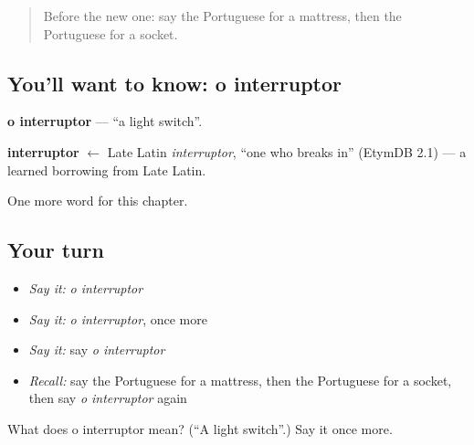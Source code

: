 \begin{quote}
Before the new one: say the Portuguese for a mattress, then the Portuguese for a socket.
\end{quote}

\subsection*{You'll want to know: o interruptor}
\textbf{o interruptor} — \textquotedblleft{}a light switch\textquotedblright{}.

\begin{cousinweb}
\textbf{interruptor} $\leftarrow$ Late Latin \emph{interruptor}, \textquotedblleft{}one who breaks in\textquotedblright{} (EtymDB 2.1) — a learned borrowing from Late Latin.
\end{cousinweb}

\begin{grammarlens}[title={What you've built}]
One more word for this chapter.
\end{grammarlens}

\subsection*{Your turn}
\begin{itemize}
\raggedright
  \item \emph{Say it:} \emph{o interruptor}
  \item \emph{Say it:} \emph{o interruptor}, once more
  \item \emph{Say it:} say \emph{o interruptor}
  \item \emph{Recall:} say the Portuguese for a mattress, then the Portuguese for a socket, then say \emph{o interruptor} again
\end{itemize}

\begin{tcolorbox}[breakable,colback=teal!4,colframe=teal!35!black,title={Before you move on}]
What does o interruptor mean? (\textquotedblleft{}A light switch\textquotedblright{}.) Say it once more.
\end{tcolorbox}
